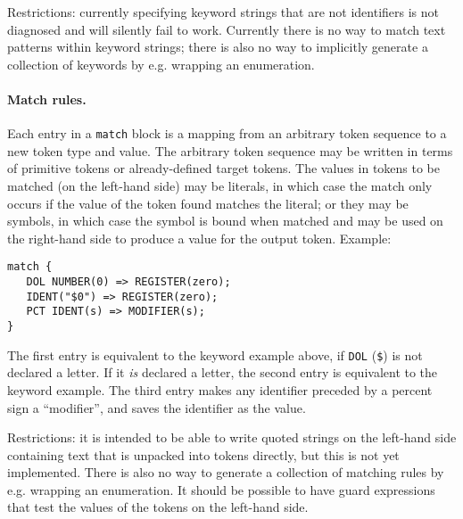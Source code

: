 Restrictions: currently specifying keyword strings that are not
identifiers is not diagnosed  and will silently fail to
work.
Currently there is no way to match text patterns within keyword
strings; there is also no way to implicitly generate a collection of
keywords by e.g. wrapping an enumeration.

\paragraph{Match rules.}
Each entry in a \texttt{match} block is a mapping from an arbitrary
token sequence to a new token type and value.
The arbitrary token sequence may be written in terms of primitive
tokens or already-defined target tokens.
The values in tokens to be matched (on the left-hand side) may be
literals, in which case the match only occurs if the value of the
token found matches the literal; or they may be symbols, in which case
the symbol is bound when matched and may be used on the right-hand
side to produce a value for the output token.
Example:
\begin{verbatim}
match {
   DOL NUMBER(0) => REGISTER(zero);
   IDENT("$0") => REGISTER(zero);
   PCT IDENT(s) => MODIFIER(s);
}
\end{verbatim}
The first entry is equivalent to the keyword example above, if
\texttt{DOL} (\texttt{\$}) is not declared a letter.
If it \emph{is} declared a letter, the second entry is equivalent to
the keyword example.
The third entry makes any identifier preceded by a percent sign a
``modifier'', and saves the identifier as the value.

Restrictions: it is intended to be able to write quoted strings on the
left-hand side containing text that is unpacked into tokens directly,
but this is not yet implemented.
There is also no way to generate a collection of matching rules by e.g.
wrapping an enumeration.
It should be possible to have guard expressions that test the values
of the tokens on the left-hand side.

